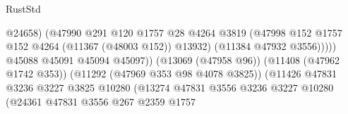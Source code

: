 \begin{lexlean}{RustStd}
\begin{coremodule}
                                                            @24658)
                                                          (@47990
                                                            @291
                                                            @120
                                                            @1757
                                                            @28
                                                            @4264
                                                            @3819
                                                            (@47998
                                                              @152
                                                              @1757
                                                              @152
                                                              @4264
                                                              (@11367 (@48003 @152))
                                                              @13932)
                                                            (@11384 @47932 @3556)))))
                                                    @45088
                                                    @45091
                                                    @45094
                                                    @45097))
                                                (@13069 (@47958 @96))
                                                (@11408 (@47962 @1742 @353))
                                                (@11292 (@47969 @353 @98 @4078 @3825))
                                                (@11426
                                                  @47831
                                                  @3236
                                                  @3227
                                                  @3825
                                                  @10280
                                                  (@13274
                                                    @47831
                                                    @3556
                                                    @3236
                                                    @3227
                                                    @10280
                                                    (@24361
                                                      @47831
                                                      @3556
                                                      @267
                                                      @2359
                                                      @1757

\end{coremodule}
\end{lexlean}
